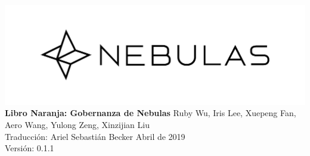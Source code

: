 \documentclass[12pt]{article}
\begin{document}
	\pagestyle{empty}
	\pagecolor{\pcolor}

	\begin{titlepage}
		\begin{center}
			\vspace*{5.5cm}
			\includegraphics[scale=0.4]{../common/Nebulas.png}
			\vspace{0.5cm}
			\textbf{\huge{Libro Naranja: Gobernanza de Nebulas}}
			\vfill
			\vspace{0.5cm}
				Ruby Wu, Iris Lee, Xuepeng Fan, Aero Wang, Yulong Zeng, Xinzijian Liu \\
				Traducción: Ariel Sebastián Becker
			\vfill
			Abril de 2019\\
			Versión: 0.1.1
			\textbf{}
		\end{center}
	\end{titlepage}

	\setcounter{page}{0}

	\tableofcontents

	\newpage
	\setcounter{page}{1}
	\pagestyle{fancy}
	\vspace*{0.01cm}
	

	\newpage
	

	\newpage
	\begin{appendices}
		\newpage
	\end{appendices}
\end{document}

